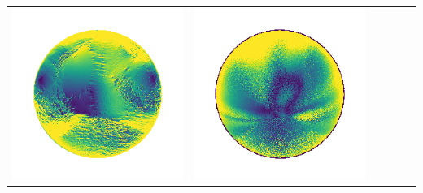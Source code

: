 \begin{tabularx}{\linewidth}{@{}Y@{}Y@{}Y@{}Y@{}Y@{}Y@{}}
\includegraphics[width=\linewidth]{semisynthetic/20160617_13_yu_err.png} &
\includegraphics[width=\linewidth]{semisynthetic/20160617_13_dpsn_err.png} &

\end{tabularx}
